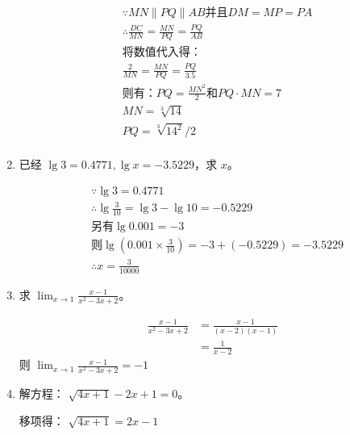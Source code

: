 \documentclass[answers]{exam}
\begin{document}
\begin{questions}
\begin{enumerate}[label=(\arabic*)]
		      \begin{solution}
			      \begin{align*}
				       & \because MN \parallel PQ \parallel AB \text{并且} DM = MP = PA \\
				       & \therefore \frac{DC}{MN} = \frac{MN}{PQ} = \frac{PQ}{AB}     \\
				       & \text{将数值代入得：}                                               \\
				       & \frac{2}{MN} = \frac{MN}{PQ} = \frac{PQ}{3.5}                \\
				       & \text{则有：} PQ = \frac{MN^2}{2} \text{和} PQ \cdot MN = 7      \\
				       & MN = \sqrt[3]{14}                                            \\
				       & PQ = \sqrt[3]{14^2} / 2                                      \\
			      \end{align*}
		      \end{solution}
		\item 已经 \( \lg3=0.4771, \lg{x}=-3.5229 \)，求 \( x \)。
		      \begin{solution}
			      \begin{align*}
				       & \because \lg3                              = 0.4771                  \\
				       & \therefore \lg{\frac{3}{10}}               = \lg3 - \lg10 = -0.5229  \\
				       & \text{另有} \lg0.001                       = -3                        \\
				       & \text{则} \lg(0.001 \times \frac{3}{10} )  = -3 + (-0.5229) = -3.5229 \\
				       & \therefore x = \frac{3}{10000}
			      \end{align*}
		      \end{solution}
		\item 求 \(\displaystyle \lim_{x\to1}\frac{x-1}{x^2-3x+2} \)。
		      \begin{solution}
			      \begin{align*}
				      \frac{x-1}{x^2 - 3x + 2} & = \frac{x-1}{(x-2)(x-1)} \\
				                               & = \frac{1}{x-2}
			      \end{align*}
			      则 \( \displaystyle \lim_{x\to1}\frac{x-1}{x^2-3x+2}=-1 \)
		      \end{solution}
		\item 解方程： \( \sqrt{4x+1} - 2x + 1 = 0 \)。
		      \begin{solution}
			      移项得：
			      \begin{math}
				      \sqrt{4x+1} = 2x - 1
			      \end{math}


\end{solution}
\end{enumerate}
\end{questions}
\end{document}
